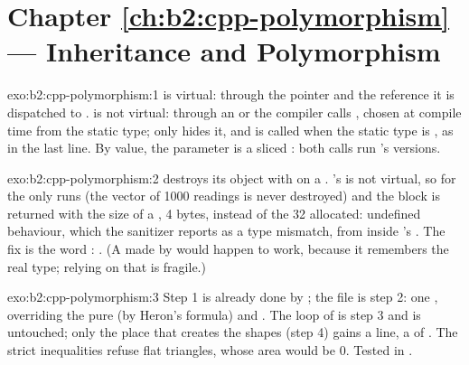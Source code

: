\section*{Chapter \ref{ch:b2:cpp-polymorphism} --- Inheritance and Polymorphism}

\begin{solution}{exo:b2:cpp-polymorphism:1}
 is virtual: through the pointer and the reference it is dispatched to .  is not
virtual: through an  or  the compiler calls , chosen at compile time from
the static type;  only hides it, and is called when the static type is , as in the last
line. By value, the parameter is a sliced : both calls run 's versions.
\end{solution}

\begin{solution}{exo:b2:cpp-polymorphism:2}
 destroys its object with  on a . 's
 is not virtual, so for the  only  runs (the vector of 1000 readings is
never destroyed) and the block is returned with the size of a , 4 bytes, instead of the 32 allocated:
undefined behaviour, which the sanitizer reports as a type mismatch, from inside 's . The
fix is the word : . (A  made by
 would happen to work, because it remembers the real type; relying on that is
fragile.)
\end{solution}

\begin{solution}{exo:b2:cpp-polymorphism:3}
Step 1 is already done by ; the file is step 2: one , overriding the pure  (by
Heron's formula) and . The loop of  is step 3 and is untouched; only the place that creates
the shapes (step 4) gains a line, a  of . The strict
inequalities refuse flat triangles, whose area would be 0. Tested in .
\end{solution}

